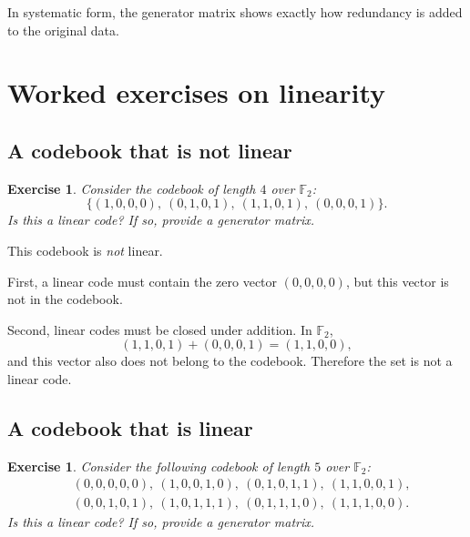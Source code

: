 \documentclass[11pt]{article}
\newtheorem{exercise}[definition]{Exercise}
\newenvironment{solution}{\begin{tcolorbox}[colback=white,colframe=accent!45,title=Solution,boxrule=0.5pt,arc=1.5mm]}{\end{tcolorbox}}
\newcommand{\F}{\mathbb{F}}
\begin{document}
\begin{keyidea}
In systematic form, the generator matrix shows exactly how redundancy is added to the original data.
\end{keyidea}

\section{Worked exercises on linearity}

\subsection{A codebook that is not linear}

\begin{exercise}
Consider the codebook of length \(4\) over \(\F_2\):
\[
\{(1,0,0,0),\ (0,1,0,1),\ (1,1,0,1),\ (0,0,0,1)\}.
\]
Is this a linear code? If so, provide a generator matrix.
\end{exercise}

\begin{solution}
This codebook is \emph{not} linear.

First, a linear code must contain the zero vector \((0,0,0,0)\), but this vector is not in the codebook.

Second, linear codes must be closed under addition. In \(\F_2\),
\[
(1,1,0,1)+(0,0,0,1)=(1,1,0,0),
\]
and this vector also does not belong to the codebook. Therefore the set is not a linear code.
\end{solution}

\subsection{A codebook that is linear}

\begin{exercise}
Consider the following codebook of length \(5\) over \(\F_2\):
\begin{align*}
&(0,0,0,0,0),\ (1,0,0,1,0),\ (0,1,0,1,1),\ (1,1,0,0,1),\\
&(0,0,1,0,1),\ (1,0,1,1,1),\ (0,1,1,1,0),\ (1,1,1,0,0).
\end{align*}
Is this a linear code? If so, provide a generator matrix.
\end{exercise}
\end{document}
